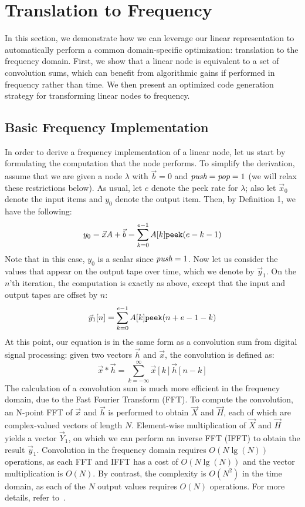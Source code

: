\section{Translation to Frequency}
\label{sec:freq}

In this section, we demonstrate how we can leverage our linear
representation to automatically perform a common domain-specific
optimization: translation to the frequency domain.  First, we show
that a linear node is equivalent to a set of convolution sums, which
can benefit from algorithmic gains if performed in frequency rather
than time.  We then present an optimized code generation strategy for
transforming linear nodes to frequency.

\subsection{Basic Frequency Implementation}

In order to derive a frequency implementation of a linear node, let us
start by formulating the computation that the node performs.  To
simplify the derivation, assume that we are given a node $\lambda$
with ${\vec b = 0}$ and $\mbox{\it push}=\mbox{\it pop}=1$ (we will relax these
restrictions below).  As usual, let $e$ denote the peek rate for
$\lambda$; also let ${\vec x}_0$ denote the input items and $y_0$
denote the output item.  Then, by Definition 1, we have the following:
\[
y_0 = {\vec x} A + {\vec b} = \sum_{k=0}^{e-1} A[k] \mbox{\tt peek}(e-k-1)
\]
Note that in this case, $y_0$ is a scalar since $\mbox{\it push}=1$.  Now
let us consider the values that appear on the output tape over time,
which we denote by ${\vec y}_1$.  On the $n$'th iteration, the
computation is exactly as above, except that the input and output
tapes are offset by $n$:
\[
\protect\label{eq:linconv}
{\vec y}_1[n] = \sum_{k=0}^{e-1} A[k] \mbox{\tt peek}(n+e-1-k) 
\]
At this point, our equation is in the same form as a convolution sum
from digital signal processing: given two vectors ${\vec h}$ and
${\vec x}$, the convolution is defined as:
\[
{\vec x} * {\vec h} = \sum_{k=-\infty}^{\infty} {\vec x}[k] {\vec h}[n-k]
\]
The calculation of a convolution sum is much more efficient in the
frequency domain, due to the Fast Fourier Transform (FFT).  To compute
the convolution, an N-point FFT of ${\vec x}$ and ${\vec h}$ is
performed to obtain ${\vec X}$ and ${\vec H}$, each of which are
complex-valued vectors of length $N$.  Element-wise multiplication of
${\vec X}$ and ${\vec H}$ yields a vector ${\vec Y}_1$, on which we can
perform an inverse FFT (IFFT) to obtain the result ${\vec y}_1$.
Convolution in the frequency domain requires $O(N \lg(N))$ operations,
as each FFT and IFFT has a cost of $O(N \lg (N))$ and the vector
multiplication is $O(N)$.  By contrast, the complexity is $O(N^2)$ in
the time domain, as each of the $N$ output values requires $O(N)$
operations.  For more details, refer to~\cite{oppenheim-discrete}.

